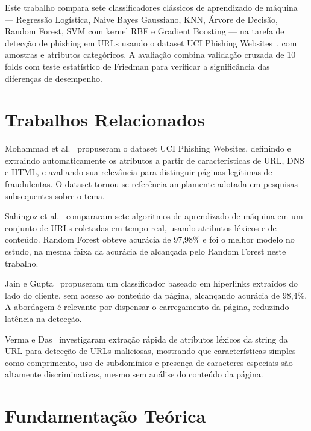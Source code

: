 \documentclass[12pt]{article}
\begin{document}
Este trabalho compara sete classificadores clássicos de aprendizado de
máquina — Regressão Logística, Naive Bayes Gaussiano, KNN, Árvore de
Decisão, Random Forest, SVM com kernel RBF e Gradient Boosting — na tarefa
de detecção de phishing em URLs usando o dataset UCI Phishing
Websites~\cite{mohammad2012}, com \nTotal{} amostras e \nFeatures{} atributos
categóricos. A avaliação combina validação cruzada de 10 folds com teste
estatístico de Friedman para verificar a significância das diferenças de
desempenho.

\section{Trabalhos Relacionados}

Mohammad et al.~\cite{mohammad2012} propuseram o dataset UCI Phishing Websites,
definindo e extraindo automaticamente os \nFeatures{} atributos a partir de
características de URL, DNS e HTML, e avaliando sua relevância para distinguir
páginas legítimas de fraudulentas. O dataset tornou-se referência amplamente
adotada em pesquisas subsequentes sobre o tema.

Sahingoz et al.~\cite{sahingoz2019} compararam sete algoritmos de aprendizado
de máquina em um conjunto de URLs coletadas em tempo real, usando atributos
léxicos e de conteúdo. Random Forest obteve acurácia de 97,98\% e foi o
melhor modelo no estudo, na mesma faixa da acurácia de \melhorAcuracia{}
alcançada pelo Random Forest neste trabalho.

Jain e Gupta~\cite{jain2018} propuseram um classificador baseado em
hiperlinks extraídos do lado do cliente, sem acesso ao conteúdo da página,
alcançando acurácia de 98,4\%. A abordagem é relevante por dispensar o
carregamento da página, reduzindo latência na detecção.

Verma e Das~\cite{verma2017} investigaram extração rápida de atributos
léxicos da string da URL para detecção de URLs maliciosas, mostrando que
características simples como comprimento, uso de subdomínios e presença de
caracteres especiais são altamente discriminativas, mesmo sem análise do
conteúdo da página.

\section{Fundamentação Teórica}
\end{document}
